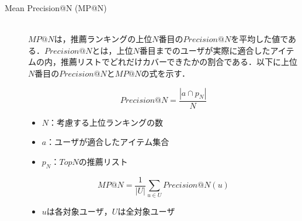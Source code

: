 \documentclass[12pt]{jarticle} %
\begin{document}
\begin{description}
\item[Mean Precision@N (MP@N)]~\\
$MP@N$は，推薦ランキングの上位$N$番目の$Precision@N$を平均した値である．$Precision@N$とは，上位$N$番目までのユーザが実際に適合したアイテムの内，推薦リストでどれだけカバーできたかの割合である．以下に上位$N$番目の$Precision@N$と$MP@N$の式を示す．

\[
Precision@N =
\frac{|a \cap p_N|}{N}
\]
\begin{itemize}
\item $N：考慮する上位ランキングの数$
\item $a：ユーザが適合したアイテム集合$
\item $p_N：TopNの推薦リスト$
\end{itemize}

\[
MP@N =
\frac{1}{|U|}\sum_{u\in U} Precision@N(u)
\]
\begin{itemize}
\item $uは各対象ユーザ，Uは全対象ユーザ$
\end{itemize}

\end{description}

\end{document}
